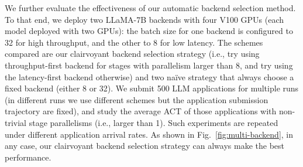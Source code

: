 
We further evaluate the effectiveness of our automatic backend selection method.
To that end, we deploy two LLaMA-7B backends with four V100 GPUs (each model deployed with two GPUs):
the batch size for one backend is configured to 32 for high throughput, and the other to 8 for low latency.
The schemes compared are our clairvoyant backend selection strategy (i.e., try using throughput-first backend for stages with parallelism larger than 8, and try using the latency-first backend otherwise) and two naïve strategy that always choose a fixed backend (either 8 or 32).
We submit 500 LLM applications for multiple runs (in different runs we use different schemes but the application submission trajectory are fixed), and study the average ACT of those applications with non-trivial stage parallelisms (i.e., larger than 1). %
Such experiments are repeated under different application arrival rates.
As shown in Fig.~\ref{fig:multi-backend}, in any case, our clairvoyant backend selection strategy can always make the best performance.





